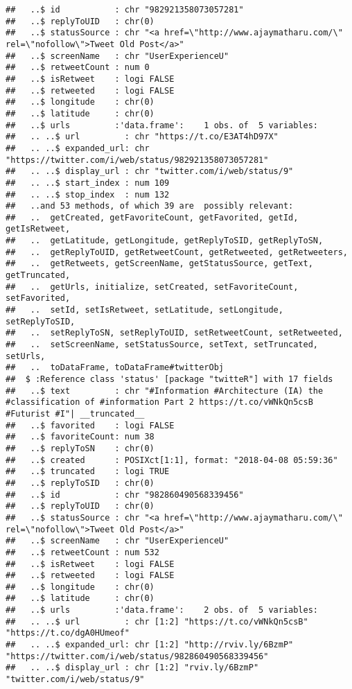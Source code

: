 \documentclass[]{article}
\begin{document}
\begin{verbatim}
##   ..$ id           : chr "982921358073057281"
##   ..$ replyToUID   : chr(0) 
##   ..$ statusSource : chr "<a href=\"http://www.ajaymatharu.com/\" rel=\"nofollow\">Tweet Old Post</a>"
##   ..$ screenName   : chr "UserExperienceU"
##   ..$ retweetCount : num 0
##   ..$ isRetweet    : logi FALSE
##   ..$ retweeted    : logi FALSE
##   ..$ longitude    : chr(0) 
##   ..$ latitude     : chr(0) 
##   ..$ urls         :'data.frame':    1 obs. of  5 variables:
##   .. ..$ url         : chr "https://t.co/E3AT4hD97X"
##   .. ..$ expanded_url: chr "https://twitter.com/i/web/status/982921358073057281"
##   .. ..$ display_url : chr "twitter.com/i/web/status/9"
##   .. ..$ start_index : num 109
##   .. ..$ stop_index  : num 132
##   ..and 53 methods, of which 39 are  possibly relevant:
##   ..  getCreated, getFavoriteCount, getFavorited, getId, getIsRetweet,
##   ..  getLatitude, getLongitude, getReplyToSID, getReplyToSN,
##   ..  getReplyToUID, getRetweetCount, getRetweeted, getRetweeters,
##   ..  getRetweets, getScreenName, getStatusSource, getText, getTruncated,
##   ..  getUrls, initialize, setCreated, setFavoriteCount, setFavorited,
##   ..  setId, setIsRetweet, setLatitude, setLongitude, setReplyToSID,
##   ..  setReplyToSN, setReplyToUID, setRetweetCount, setRetweeted,
##   ..  setScreenName, setStatusSource, setText, setTruncated, setUrls,
##   ..  toDataFrame, toDataFrame#twitterObj
##  $ :Reference class 'status' [package "twitteR"] with 17 fields
##   ..$ text         : chr "#Information #Architecture (IA) the #classification of #information Part 2 https://t.co/vWNkQn5csB #Futurist #I"| __truncated__
##   ..$ favorited    : logi FALSE
##   ..$ favoriteCount: num 38
##   ..$ replyToSN    : chr(0) 
##   ..$ created      : POSIXct[1:1], format: "2018-04-08 05:59:36"
##   ..$ truncated    : logi TRUE
##   ..$ replyToSID   : chr(0) 
##   ..$ id           : chr "982860490568339456"
##   ..$ replyToUID   : chr(0) 
##   ..$ statusSource : chr "<a href=\"http://www.ajaymatharu.com/\" rel=\"nofollow\">Tweet Old Post</a>"
##   ..$ screenName   : chr "UserExperienceU"
##   ..$ retweetCount : num 532
##   ..$ isRetweet    : logi FALSE
##   ..$ retweeted    : logi FALSE
##   ..$ longitude    : chr(0) 
##   ..$ latitude     : chr(0) 
##   ..$ urls         :'data.frame':    2 obs. of  5 variables:
##   .. ..$ url         : chr [1:2] "https://t.co/vWNkQn5csB" "https://t.co/dgA0HUmeof"
##   .. ..$ expanded_url: chr [1:2] "http://rviv.ly/6BzmP" "https://twitter.com/i/web/status/982860490568339456"
##   .. ..$ display_url : chr [1:2] "rviv.ly/6BzmP" "twitter.com/i/web/status/9"

\end{verbatim}
\end{document}
